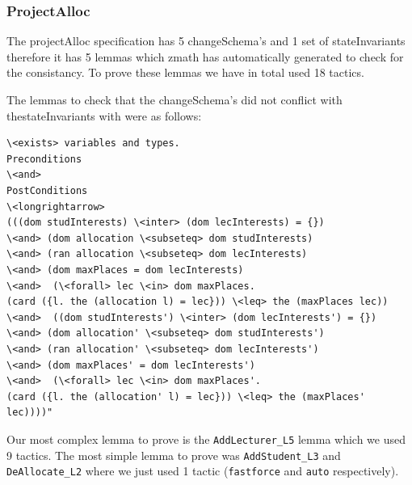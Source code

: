 \subsubsection{ProjectAlloc}

The projectAlloc specification has 5 changeSchema's and 1 set of stateInvariants therefore it has 5 lemmas which \gls{zmath} has automatically generated to check for the consistancy. To prove these lemmas we have in total used 18 tactics.

The lemmas to check that the changeSchema's did not conflict with thestateInvariants with were as follows:

\begin{verbatim}
\<exists> variables and types.
Preconditions
\<and>
PostConditions
\<longrightarrow>
(((dom studInterests) \<inter> (dom lecInterests) = {})
\<and> (dom allocation \<subseteq> dom studInterests)
\<and> (ran allocation \<subseteq> dom lecInterests)
\<and> (dom maxPlaces = dom lecInterests)
\<and>  (\<forall> lec \<in> dom maxPlaces.
(card ({l. the (allocation l) = lec})) \<leq> the (maxPlaces lec))
\<and>  ((dom studInterests') \<inter> (dom lecInterests') = {})
\<and> (dom allocation' \<subseteq> dom studInterests')
\<and> (ran allocation' \<subseteq> dom lecInterests')
\<and> (dom maxPlaces' = dom lecInterests')
\<and>  (\<forall> lec \<in> dom maxPlaces'.
(card ({l. the (allocation' l) = lec})) \<leq> the (maxPlaces' lec))))"
\end{verbatim}

Our most complex lemma to prove is the \verb|AddLecturer_L5| lemma which we used 9 tactics. The most simple lemma to prove was \verb|AddStudent_L3| and \verb|DeAllocate_L2| where we just used 1 tactic (\verb|fastforce| and \verb|auto| respectively).

